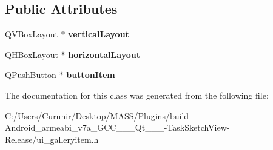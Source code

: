 \subsection*{Public Attributes}
\begin{DoxyCompactItemize}
\item 
\mbox{\label{class_ui___gallery_item_a2db1b310fe95ef11717e33e27c22c964}} 
Q\+V\+Box\+Layout $\ast$ {\bfseries vertical\+Layout}
\item 
\mbox{\label{class_ui___gallery_item_ac84eb76b3c50efd4bc16e0442decd0c2}} 
Q\+H\+Box\+Layout $\ast$ {\bfseries horizontal\+Layout\+\_}
\item 
\mbox{\label{class_ui___gallery_item_a0dab2d2368e7025b98577007bba91d28}} 
Q\+Push\+Button $\ast$ {\bfseries button\+Item}
\end{DoxyCompactItemize}


The documentation for this class was generated from the following file\+:\begin{DoxyCompactItemize}
\item 
C\+:/\+Users/\+Curunir/\+Desktop/\+M\+A\+S\+S/\+Plugins/build-\/\+Android\+\_\+armeabi\+\_\+v7a\+\_\+\+G\+C\+C\+\_\+\_\+\_\+\+Qt\+\_\+\_\+\_-\/\+Task\+Sketch\+View-\/\+Release/ui\+\_\+galleryitem.\+h\end{DoxyCompactItemize}
